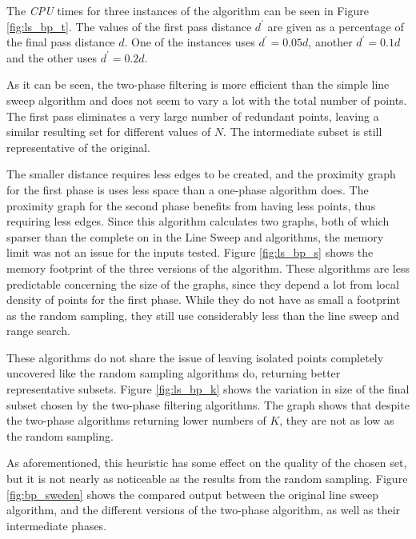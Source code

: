 

The \emph{CPU} times for three instances of the algorithm can be seen in Figure \ref{fig:ls_bp_t}. The values of the first pass distance $d^\prime$ are given as a percentage of the final pass distance $d$. One of the instances uses $d^\prime=0.05d$, another $d^\prime=0.1d$ and the other uses $d^\prime=0.2d$.

As it can be seen, the two-phase filtering is more efficient than the simple line sweep algorithm and does not seem to vary a lot with the total number of points. The first pass eliminates a very large number of redundant points, leaving a similar resulting set for different values of $N$. The intermediate subset is still representative of the original. 

The smaller distance requires less edges to be created, and the proximity graph for the first phase is uses less space than a one-phase algorithm does. The proximity graph for the second phase benefits from having less points, thus requiring less edges. Since this algorithm calculates two graphs, both of which sparser than the complete on in the Line Sweep and \kdtree algorithms, the memory limit was not an issue for the inputs tested. Figure \ref{fig:ls_bp_s} shows the memory footprint of the three versions of the algorithm. These algorithms are less predictable concerning the size of the graphs, since they depend a lot from local density of points for the first phase. While they do not have as small a footprint as the random sampling, they still use considerably less than the line sweep and \kdtree range search. 

These algorithms do not share the issue of leaving isolated points completely uncovered like the random sampling algorithms do, returning better representative subsets. Figure \ref{fig:ls_bp_k} shows the variation in size of the final subset chosen by the two-phase filtering algorithms.
The graph shows that despite the two-phase algorithms returning lower numbers of $K$, they are not as low as the random sampling. 





As aforementioned, this heuristic has some effect on the quality of the chosen set, but it is not nearly as noticeable as the results from the random sampling. Figure \ref{fig:bp_sweden} shows the compared output between the original line sweep algorithm, and the different versions of the two-phase algorithm, as well as their intermediate phases.

